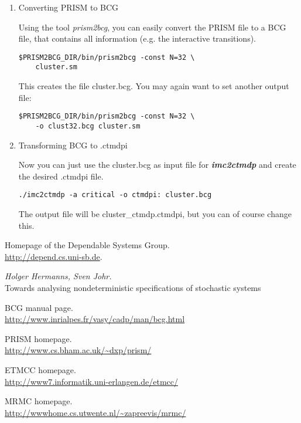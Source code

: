 \documentclass[a4paper,11pt]{scrartcl}
\newcommand{\imcToCtmdp}{\textbf{\textit{imc2ctmdp}} }
\begin{document}
\begin{enumerate}

\item Converting PRISM to BCG

Using the tool \emph{prism2bcg}, you can easily convert the PRISM file to a
BCG file, that contains all information (e.g. the interactive transitions).
\begin{verbatim}
$PRISM2BCG_DIR/bin/prism2bcg -const N=32 \
    cluster.sm
\end{verbatim}
This creates the file cluster.bcg. You may again want to set another output
file:
\begin{verbatim}
$PRISM2BCG_DIR/bin/prism2bcg -const N=32 \
    -o clust32.bcg cluster.sm
\end{verbatim}

\item Transforming BCG to .ctmdpi

Now you can just use the cluster.bcg as input file for \imcToCtmdp and create
the desired .ctmdpi file.
\begin{verbatim}
./imc2ctmdp -a critical -o ctmdpi: cluster.bcg
\end{verbatim}
The output file will be cluster\_ctmdp.ctmdpi, but you can of course change
this.

\end{enumerate}




\begin{thebibliography}{m}

Homepage of the Dependable Systems Group.\\
\url{http://depend.cs.uni-sb.de}.

\emph{Holger Hermanns, Sven Johr.}\\
Towards analysing nondeterministic specifications of stochastic systems

\bibitem{bcg-page}
BCG manual page.\\
\url{http://www.inrialpes.fr/vasy/cadp/man/bcg.html}

PRISM homepage.\\
\url{http://www.cs.bham.ac.uk/~dxp/prism/}

ETMCC homepage.\\
\url {http://www7.informatik.uni-erlangen.de/etmcc/}

MRMC homepage.\\
\url{http://wwwhome.cs.utwente.nl/~zapreevis/mrmc/}

\end{thebibliography}
\end{document}

